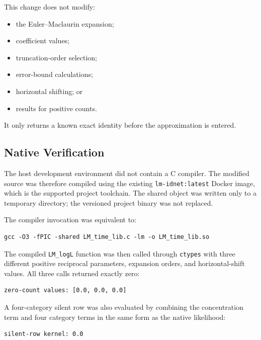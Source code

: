 \documentclass[11pt,a4paper]{article}
\begin{document}
This change does not modify:

\begin{itemize}

\item the Euler--Maclaurin expansion;

\item coefficient values;

\item truncation-order selection;

\item error-bound calculations;

\item horizontal shifting; or

\item results for positive counts.

\end{itemize}

It only returns a known exact identity before the approximation is entered.

\subsection{Native Verification}

The host development environment did not contain a C compiler. The modified
source was therefore compiled using the existing \texttt{lm-idnet:latest}
Docker image, which is the supported project toolchain. The shared object was
written only to a temporary directory; the versioned project binary was not
replaced.

The compiler invocation was equivalent to:

\begin{verbatim}
gcc -O3 -fPIC -shared LM_time_lib.c -lm -o LM_time_lib.so
\end{verbatim}

The compiled \texttt{LM\_logL} function was then called through
\texttt{ctypes} with three different positive reciprocal parameters, expansion
orders, and horizontal-shift values. All three calls returned exactly zero:

\begin{verbatim}
zero-count values: [0.0, 0.0, 0.0]
\end{verbatim}

A four-category silent row was also evaluated by combining the concentration
term and four category terms in the same form as the native likelihood:

\begin{verbatim}
silent-row kernel: 0.0
\end{verbatim}
\end{document}
